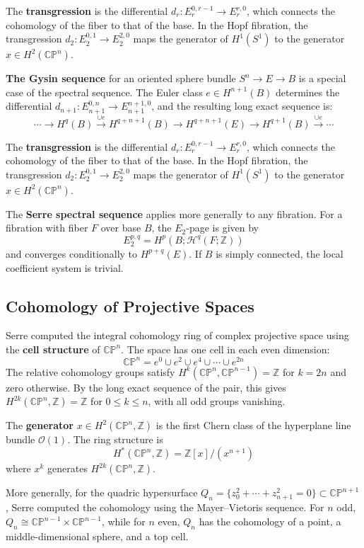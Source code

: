 The \textbf{transgression} is the differential $d_r: E_r^{0,r-1} \to E_r^{r,0}$, which connects the cohomology of the fiber to that of the base. In the Hopf fibration, the transgression $d_2: E_2^{0,1} \to E_2^{2,0}$ maps the generator of $H^1(S^1)$ to the generator $x \in H^2(\mathbb{CP}^n)$.

\textbf{The Gysin sequence} for an oriented sphere bundle $S^n \to E \to B$ is a special case of the spectral sequence. The Euler class $e \in H^{n+1}(B)$ determines the differential $d_{n+1}: E_{n+1}^{0,n} \to E_{n+1}^{n+1,0}$, and the resulting long exact sequence is:
\[\cdots \to H^q(B) \xrightarrow{\cup e} H^{q+n+1}(B) \to H^{q+n+1}(E) \to H^{q+1}(B) \xrightarrow{\cup e} \cdots\]

The \textbf{transgression} is the differential $d_r: E_r^{0,r-1} \to E_r^{r,0}$, which connects the cohomology of the fiber to that of the base. In the Hopf fibration, the transgression $d_2: E_2^{0,1} \to E_2^{2,0}$ maps the generator of $H^1(S^1)$ to the generator $x \in H^2(\mathbb{CP}^n)$.

The \textbf{Serre spectral sequence} applies more generally to any fibration. For a fibration with fiber $F$ over base $B$, the $E_2$-page is given by
\[E_2^{p,q} = H^p(B; \mathcal{H}^q(F; \mathbb{Z}))\]
and converges conditionally to $H^{p+q}(E)$. If $B$ is simply connected, the local coefficient system is trivial.

\subsection{Cohomology of Projective Spaces}

Serre computed the integral cohomology ring of complex projective space using the \textbf{cell structure} of $\mathbb{CP}^n$. The space has one cell in each even dimension:
\[\mathbb{CP}^n = e^0 \cup e^2 \cup e^4 \cup \cdots \cup e^{2n}\]
The relative cohomology groups satisfy $H^k(\mathbb{CP}^n, \mathbb{CP}^{n-1}) = \mathbb{Z}$ for $k = 2n$ and zero otherwise. By the long exact sequence of the pair, this gives $H^{2k}(\mathbb{CP}^n, \mathbb{Z}) = \mathbb{Z}$ for $0 \leq k \leq n$, with all odd groups vanishing.

The \textbf{generator} $x \in H^2(\mathbb{CP}^n, \mathbb{Z})$ is the first Chern class of the hyperplane line bundle $\mathcal{O}(1)$. The ring structure is
\[H^*(\mathbb{CP}^n, \mathbb{Z}) = \mathbb{Z}[x]/(x^{n+1})\]
where $x^k$ generates $H^{2k}(\mathbb{CP}^n, \mathbb{Z})$.

More generally, for the quadric hypersurface $Q_n = \{z_0^2 + \cdots + z_{n+1}^2 = 0\} \subset \mathbb{CP}^{n+1}$, Serre computed the cohomology using the Mayer--Vietoris sequence. For $n$ odd, $Q_n \cong \mathbb{CP}^{n-1} \times \mathbb{CP}^{n-1}$, while for $n$ even, $Q_n$ has the cohomology of a point, a middle-dimensional sphere, and a top cell.

